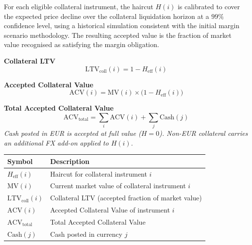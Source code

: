 \documentclass[9pt, a4paper]{extarticle}
\newenvironment{formulabox}{\par\addvspace{4pt}}{\par\addvspace{4pt}}
\newcommand{\vartableheader}{%
    \textbf{Symbol} & \textbf{Description}\\
}
\begin{document}
For each eligible collateral instrument, the haircut $H(i)$ is calibrated to
cover the expected price decline over the collateral liquidation horizon at a
$99\%$ confidence level, using a historical simulation consistent with the
initial margin scenario methodology. The resulting accepted value is the
fraction of market value recognised as satisfying the margin obligation.

\begin{formulabox}
\textbf{Collateral LTV}
\begin{equation*}
    \mathrm{LTV}_{\mathrm{coll}}(i) = 1 - H_{\mathrm{eff}}(i) 
\end{equation*}
\end{formulabox}

\begin{formulabox}
\textbf{Accepted Collateral Value}
\begin{equation*}
    \mathrm{ACV}(i) = \mathrm{MV}(i) \times \bigl(1 - H_{\mathrm{eff}}(i) \bigr)
\end{equation*}
\end{formulabox}

\begin{formulabox}
\textbf{Total Accepted Collateral Value}
\begin{equation*}
    \mathrm{ACV}_{\mathrm{total}} =
        \sum_{i} \mathrm{ACV}(i) + \sum_{j} \mathrm{Cash}(j)
\end{equation*}
\textit{Cash posted in EUR is accepted at full value ($H = 0$).
Non-EUR collateral carries an additional FX add-on applied to $H(i)$.}
\end{formulabox}

\begin{tabularx}{\linewidth}{lX}
\toprule
\vartableheader
\midrule
$H_{\mathrm{eff}}(i)$            & Haircut for collateral instrument $i$ \\
$\mathrm{MV}(i)$                & Current market value of collateral instrument $i$ \\
$\mathrm{LTV}_{\mathrm{coll}}(i)$ & Collateral LTV (accepted fraction of market value) \\
$\mathrm{ACV}(i)$               & Accepted Collateral Value of instrument $i$ \\
$\mathrm{ACV}_{\mathrm{total}}$ & Total Accepted Collateral Value \\
$\mathrm{Cash}(j)$              & Cash posted in currency $j$ \\
\bottomrule
\end{tabularx}
\end{document}
